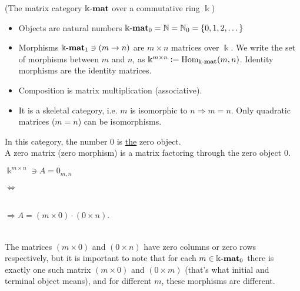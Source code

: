 \begin{example}{(The matrix category $\Bbbk\textnormal{-}\mathbf{mat}$ over a commutative ring $\Bbbk$)}\label{ex:kmat1}
\begin{itemize}
\item Objects are natural numbers $\Bbbk\textnormal{-}\mathbf{mat}_{0} = \mathbb{N} = \mathbb{N}_{0} = \{0,1,2,\dots\}$
\item Morphisms $\Bbbk\textnormal{-}\mathbf{mat}_{1} \ni (m \rightarrow n)$ are $m \times n$ matrices over $\Bbbk$.
We write the set of morphisms between $m$ and $n$, as $\Bbbk^{m\times n} := \textup{Hom}_{\Bbbk\textnormal{-}\mathbf{mat}}(m,n)$. Identity morphisms are the
identity matrices.
\item Composition is matrix multiplication (associative).
\item It is a skeletal category, i.e. $m$ is isomorphic to $n \Rightarrow m = n$. Only quadratic matrices ($m = n$) can be
isomorphisms.
\end{itemize}
In this category, the number $0$ is \ul{the} zero object.\\
A zero matrix (zero morphism) is a matrix factoring through the zero object $0$.\\
\begin{minipage}{.2\textwidth}\phantom{ }\end{minipage}
\begin{minipage}{.25\textwidth}
$\Bbbk^{m\times n} \ni A = 0_{m,n}$
\end{minipage}
\begin{minipage}{.08\textwidth}
$\Longleftrightarrow$
\end{minipage}
\begin{minipage}{.32\textwidth}
\\
$\Rightarrow A = (m \times 0) \cdot (0 \times n)$.
\end{minipage}
\begin{minipage}{.15\textwidth}\phantom{ }\end{minipage}\\

\noindent The matrices $(m \times 0)$ and $(0 \times n)$ have zero columns or zero rows respectively, but it is
important to note that for each $m \in \Bbbk\textnormal{-}\mathbf{mat}_{0}$ there is exactly one such matrix $(m \times 0)$ and $(0 \times m)$
(that's what initial and terminal object means), and for different $m$, these morphisms are different.
\end{example}

